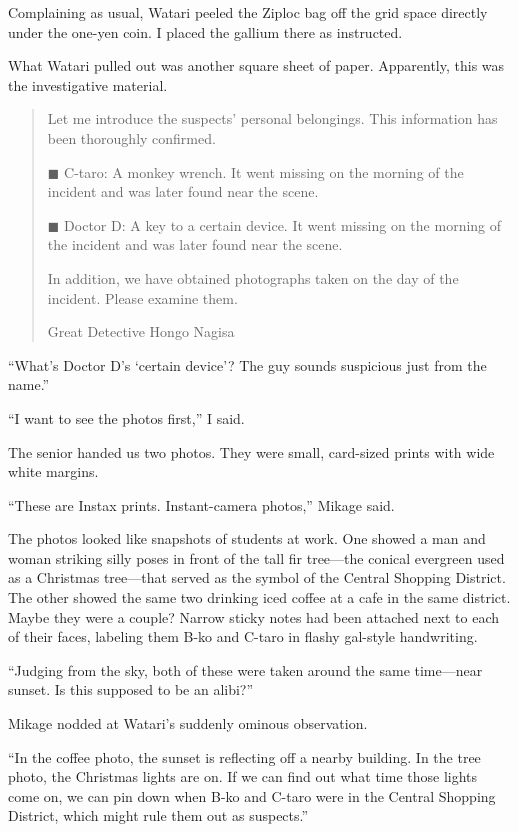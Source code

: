 \documentclass[
    a4paper,
    12pt,
    twoside,
    openany,
    UTF8,
    fontset=windows
]{ctexbook}
\begin{document}
Complaining as usual, Watari peeled the Ziploc bag off the grid space directly under the one-yen coin. I placed the gallium there as instructed.

What Watari pulled out was another square sheet of paper. Apparently, this was the investigative material.

\begin{quote}
Let me introduce the suspects' personal belongings. This information has been thoroughly confirmed.

\noindent $\blacksquare$ C-taro: A monkey wrench. It went missing on the morning of the incident and was later found near the scene.

\noindent $\blacksquare$ Doctor D: A key to a certain device. It went missing on the morning of the incident and was later found near the scene.

In addition, we have obtained photographs taken on the day of the incident. Please examine them.

\begin{flushright}
Great Detective Hongo Nagisa
\end{flushright}
\end{quote}

``What's Doctor D's `certain device'? The guy sounds suspicious just from the name.''

``I want to see the photos first,'' I said.

The senior handed us two photos. They were small, card-sized prints with wide white margins.

``These are Instax prints. Instant-camera photos,'' Mikage said.

The photos looked like snapshots of students at work. One showed a man and woman striking silly poses in front of the tall fir tree---the conical evergreen used as a Christmas tree---that served as the symbol of the Central Shopping District. The other showed the same two drinking iced coffee at a cafe in the same district. Maybe they were a couple? Narrow sticky notes had been attached next to each of their faces, labeling them B-ko and C-taro in flashy gal-style handwriting.

``Judging from the sky, both of these were taken around the same time---near sunset. Is this supposed to be an alibi?''

Mikage nodded at Watari's suddenly ominous observation.

``In the coffee photo, the sunset is reflecting off a nearby building. In the tree photo, the Christmas lights are on. If we can find out what time those lights come on, we can pin down when B-ko and C-taro were in the Central Shopping District, which might rule them out as suspects.''
\end{document}
